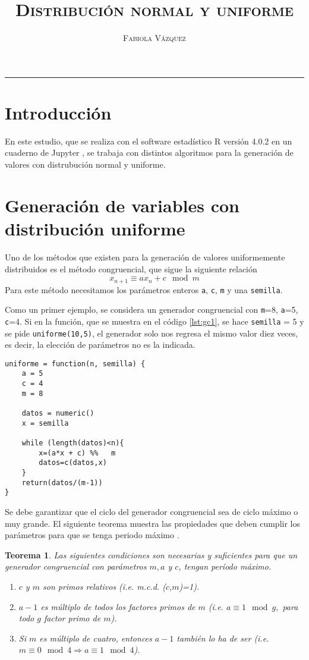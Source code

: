 \documentclass[12pt,letterpaper]{article}
\title{\textsc{Distribución normal y uniforme}}
\author{\textsc{Fabiola Vázquez}}
\newtheorem{theorem}{Teorema}
\begin{document}
\maketitle

\hrule
\section{Introducción}
En este estudio, que se realiza con el software estadístico R versión 4.0.2 \cite{R} en un cuaderno de Jupyter \cite{jupyter}, se trabaja con distintos algoritmos para la generación de valores con distrubución normal y uniforme.

\section{Generación de variables con distribución uniforme}
Uno de los métodos que existen para la generación de valores uniformemente distribuidos es el método congruencial, que sigue la siguiente relación $$x_{n+1}\equiv ax_n + c \mod m$$ Para este método necesitamos los parámetros enteros \texttt{a}, \texttt{c}, \texttt{m} y una \texttt{semilla}. 

Como un primer ejemplo, se considera un generador congruencial con \texttt{m}=8, \texttt{a}=5, \texttt{c}=4. Si en la función, que se muestra en el código \ref{lst:gc1}, se hace \texttt{semilla} = 5 y se pide \texttt{uniforme(10,5)}, el generador solo nos regresa el mismo valor diez veces, es decir, la elección de parámetros no es la indicada.

\begin{lstlisting}[label=lst:gc1,caption=Generador congruencial., frame = single]
uniforme = function(n, semilla) {
    a = 5
    c = 4
    m = 8
    
    datos = numeric()
    x = semilla
    
    while (length(datos)<n){
        x=(a*x + c) %%   m
        datos=c(datos,x)
    }
    return(datos/(m-1))
}
\end{lstlisting} 

Se debe garantizar que el ciclo del generador congruencial sea de ciclo máximo o muy grande. El siguiente teorema  muestra las propiedades que deben cumplir los parámetros para que se tenga periodo máximo \cite{int}.
\begin{theorem}
Las siguientes condiciones son necesarias y suficientes para que un generador congruencial con parámetros $m, a$ y $c$, tengan período máximo.
\begin{enumerate}
\item $c$ y $m$ son primos relativos (i.e. m.c.d. ($c$,$m$)=1).
\item $a-1$ es múltiplo de todos los factores primos de $m$ (i.e. $a\equiv 1 \mod g,$ para todo $g$ factor primo de $m$).
\item Si $m$ es múltiplo de cuatro, entonces $a-1$ también lo ha de ser (i.e. $m\equiv 0 \mod 4 \Rightarrow a \equiv 1 \mod 4$).
\end{enumerate}
\end{theorem}
\end{document}
